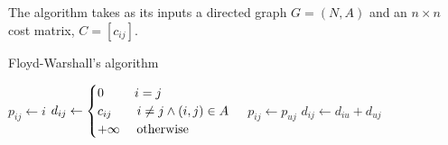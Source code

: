 The algorithm takes as its inputs a directed graph $G = (N,A)$ and an $n \times n$ cost matrix, $C = [c_{ij}]$.
\begin{algorithm}[H]
    \caption{Floyd-Warshall's algorithm}
        \begin{algorithmic}[1]
                    \State $p_{ij} \leftarrow i$
                    \State $d_{ij} \leftarrow \begin{cases}
                        0 \:\:\:\:\:\:\:\:\:\:\: i = j \\
                        c_{ij} \:\:\:\:\:\:\:\:\: i \neq j \land (i,j) \in A \\
                        +\infty \:\:\:\:\:\: \textnormal{otherwise}
                    \end{cases}$
                \EndFor
            \EndFor
                            \State $p_{ij} \leftarrow p_{uj}$
                            \State $d_{ij} \leftarrow d_{iu}+d_{uj}$
                        \EndIf
                    \EndFor
                \EndFor
                        \State \Return
                    \EndIf
                \EndFor
            \EndFor
        \end{algorithmic}
\end{algorithm}

